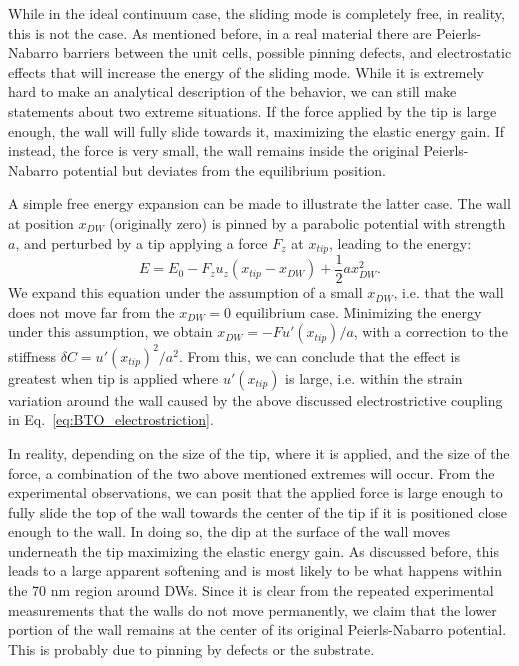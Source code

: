 While in the ideal continuum case, the sliding mode is completely free, in reality, this is not the case.
As mentioned before, in a real material there are Peierls-Nabarro barriers between the unit cells, possible pinning defects, and electrostatic effects that will increase the energy of the sliding mode.
While it is extremely hard to make an analytical description of the behavior, we can still make statements about two extreme situations.
If the force applied by the tip is large enough, the wall will fully slide towards it, maximizing the elastic energy gain.
If instead, the force is very small, the wall remains inside the original Peierls-Nabarro potential but deviates from the equilibrium position.

A simple free energy expansion can be made to illustrate the latter case.
The wall at position $x_{DW}$ (originally zero) is pinned by a parabolic potential with strength $a$, and perturbed by a tip applying a force $F_z$ at $x_{tip}$, leading to the energy:
\begin{equation}
	E = E_0 - F_z u_z (x_{tip} - x_{DW}) + \frac{1}{2}a x_{DW}^2.
\end{equation}
We expand this equation under the assumption of a small $x_{DW}$, i.e. that the wall does not move far from the $x_{DW}=0$ equilibrium case.
Minimizing the energy under this assumption, we obtain $x_{DW} = -F u'(x_{tip})/a$, with a correction to the stiffness $\delta C = u'(x_{tip})^2/a^2$.
From this, we can conclude that the effect is greatest when tip is applied where $u'(x_{tip})$ is large, i.e. within the strain variation around the wall caused by the above discussed electrostrictive coupling in Eq.~\eqref{eq:BTO_electrostriction}.

In reality, depending on the size of the tip, where it is applied, and the size of the force, a combination of the two above mentioned extremes will occur.
From the experimental observations, we can posit that the applied force is large enough to fully slide the top of the wall towards the center of the tip if it is positioned close enough to the wall.
In doing so, the dip at the surface of the wall moves underneath the tip maximizing the elastic energy gain.
As discussed before, this leads to a large apparent softening and is most likely to be what happens within the 70 nm region around DWs.
Since it is clear from the repeated experimental measurements that the walls do not move permanently, we claim that the lower portion of the wall remains at the center of its original Peierls-Nabarro potential.
This is probably due to pinning by defects or the substrate.

